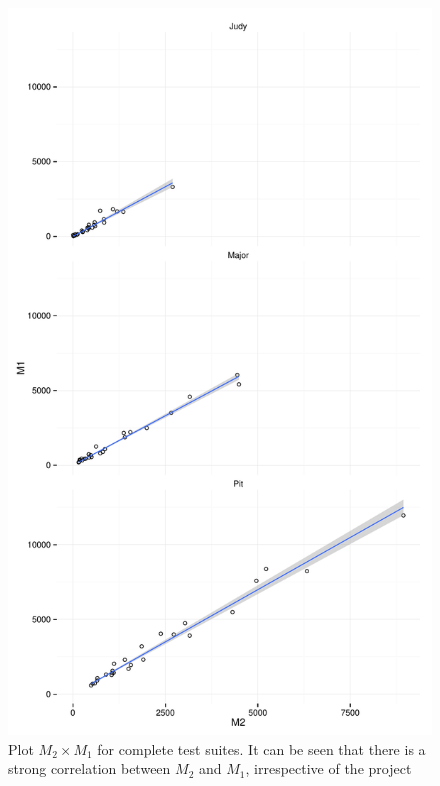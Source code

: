 \documentclass[conference]{IEEEtran}
\begin{document}
\begin{figure}[htb]
\begin{Schunk}


{\centering \includegraphics[width=.99\linewidth]{twocolumn-unnamed-chunk-7} 

}

\end{Schunk}

\caption{Plot $M_2 \times M_1$ for complete test suites. It can be seen that there is a strong
correlation between $M_2$ and $M_1$, irrespective of the project}
\label{fig:kill1}
\end{figure}
\end{document}
